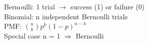 \documentclass[preview]{standalone}
\begin{document}
Bernoulli: 1 trial $\to$ success (1) or failure (0)\\Binomial: n independent Bernoulli trials\\PMF: $\displaystyle {n \choose k} p^{k}(1-p)^{n-k}$\\Special case n = 1 $\Rightarrow$ Bernoulli\\
\end{document}
